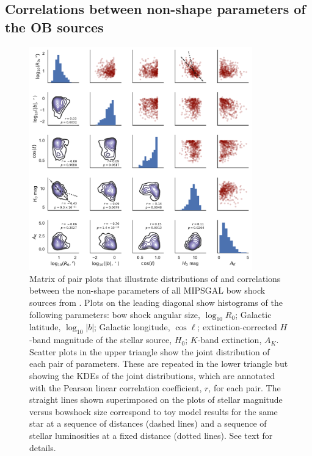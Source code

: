 \documentclass[useAMS, usenatbib, a4paper]{mnras}
\begin{document}
\subsection{Correlations between non-shape parameters of the OB sources}
\label{sec:corr-size}

\begin{figure}
  \centering
  \includegraphics[width=0.86\textwidth]{figs/mipsgal-pairplot}
  \vspace*{-\baselineskip}
  \caption[]{Matrix of pair plots that illustrate distributions of and
    correlations between the non-shape parameters of all MIPSGAL bow
    shock sources from \citet{Kobulnicky:2016a}.  Plots on the leading
    diagonal show histograms of the following parameters: bow shock
    angular size, \(\log_{10} R_0\); Galactic latitude,
    \(\log_{10}|b|\); Galactic longitude, \(\cos \ell\);
    extinction-corrected \(H\)-band magnitude of the stellar source,
    \(H_0\); \(K\)-band extinction, \(A_K\).  Scatter plots in the
    upper triangle show the joint distribution of each pair of
    parameters.  These are repeated in the lower triangle but showing
    the KDEs of the joint distributions, which are annotated with the
    Pearson linear correlation coefficient, \(r\), for each pair. The
    straight lines shown superimposed on the plots of stellar magnitude
    versus bowshock size correspond to toy model results for the same star
    at a sequence of distances (dashed lines) and a sequence of
    stellar luminosities at a fixed distance (dotted lines).  See text
    for details. }
  \label{fig:mipsgal-pairplot}
\end{figure}
\end{document}

